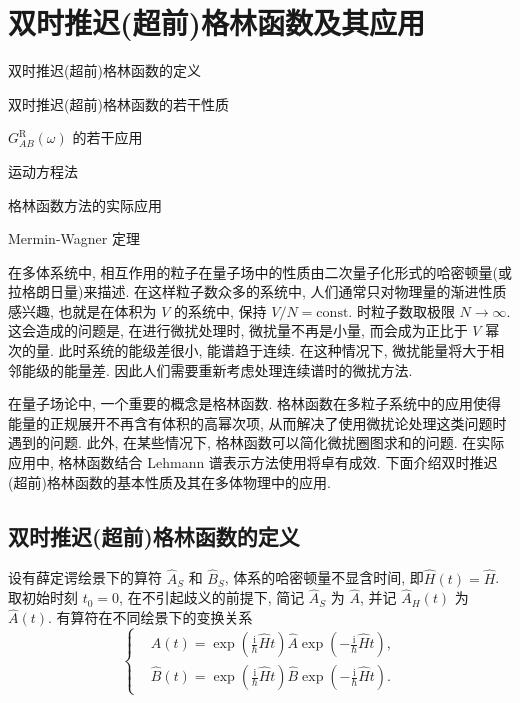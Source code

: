 \chapter{双时推迟(超前)格林函数及其应用}
\begin{introduction}
\item 双时推迟(超前)格林函数的定义
\item 双时推迟(超前)格林函数的若干性质
\item $G_{AB}^{\mathrm {R}}(\omega )$ 的若干应用
\item 运动方程法
\item 格林函数方法的实际应用
\item Mermin-Wagner 定理
\end{introduction}
在多体系统中, 相互作用的粒子在量子场中的性质由二次量子化形式的哈密顿量(或拉格朗日量)来描述. 在这样粒子数众多的系统中, 人们通常只对物理量的渐进性质感兴趣, 也就是在体积为 $V$ 的系统中, 保持 $V/N=\mathrm{const.}$ 时粒子数取极限 $N\to \infty$. 这会造成的问题是, 在进行微扰处理时, 微扰量不再是小量, 而会成为正比于 $V$ 幂次的量. 此时系统的能级差很小, 能谱趋于连续. 在这种情况下, 微扰能量将大于相邻能级的能量差. 因此人们需要重新考虑处理连续谱时的微扰方法. 

在量子场论中, 一个重要的概念是格林函数. 格林函数在多粒子系统中的应用使得能量的正规展开不再含有体积的高幂次项, 从而解决了使用微扰论处理这类问题时遇到的问题. 此外, 在某些情况下, 格林函数可以简化微扰圈图求和的问题. 在实际应用中, 格林函数结合 Lehmann 谱表示方法使用将卓有成效. 下面介绍双时推迟(超前)格林函数的基本性质及其在多体物理中的应用.

\section{双时推迟(超前)格林函数的定义}
设有薛定谔绘景下的算符 $\hat A_S$ 和 $\hat B_S$, 体系的哈密顿量不显含时间, 即$\hat H(t)=\hat H$. 取初始时刻 $t_0=0$, 在不引起歧义的前提下, 简记 $\hat A_S$ 为 $\hat A$, 并记 $\hat A_H(t)$ 为 $\hat A(t)$. 有算符在不同绘景下的变换关系
\begin{equation}
    \left\{
        \begin{aligned}
            &\hat A(t)=\exp\left( \frac{\mathrm{i}}{\hbar}\hat Ht \right) \hat A\exp\left( -\frac{\mathrm{i}}{\hbar}\hat Ht \right), \\
            &\hat B(t)=\exp\left( \frac{\mathrm{i}}{\hbar}\hat Ht \right) \hat B\exp\left( -\frac{\mathrm{i}}{\hbar}\hat Ht \right). 
        \end{aligned}
    \right. 
\end{equation}

